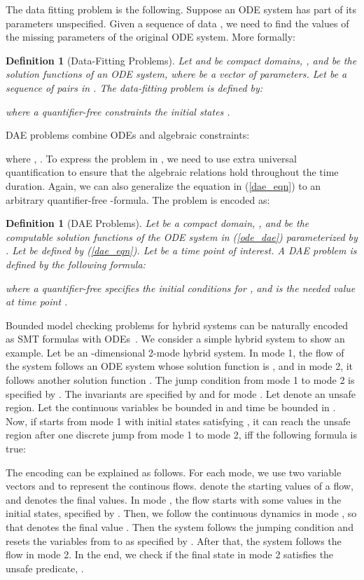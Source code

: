 \documentclass[12pt]{article}
\newtheorem{definition}[theorem]{Definition}
\begin{document}
The data fitting problem is the following. Suppose an ODE system has part of its parameters unspecified. Given a sequence of data , we need to find the values of the missing parameters of the original ODE system. More formally:
\begin{definition}[Data-Fitting Problems]
Let  and  be compact domains, , and  be the solution functions of an ODE system, where  be a vector of parameters. Let  be a sequence of pairs in . The data-fitting problem is defined by:

where a quantifier-free  constraints the initial states . 
\end{definition}


 DAE problems combine ODEs and algebraic constraints:

where , . To express the problem in , we need to use extra universal quantification to ensure that the algebraic relations hold throughout the time duration. Again, we can also generalize the equation in (\ref{dae_eqn}) to an arbitrary quantifier-free -formula. The problem is encoded as:
\begin{definition}[DAE Problems]
Let  be a compact domain, , and  be the computable solution functions of the ODE system in (\ref{ode_dae}) parameterized by . Let  be defined by (\ref{dae_eqn}). Let  be a time point of interest. A DAE problem is defined by the following formula:

where a quantifier-free  specifies the initial conditions for , and  is the needed value at time point . 
\end{definition}

 Bounded model checking problems for hybrid systems can be naturally encoded as SMT formulas with ODEs~\cite{Eggers2008,Eggers2011,DBLP:journals/sttt/IshiiUH11,DBLP:conf/fmcad/CimattiMT12,DBLP:conf/aaai/CimattiMT12}. We consider a simple hybrid system to show an example. Let  be an -dimensional 2-mode hybrid system. In mode 1, the flow of the system follows an ODE system whose solution function is , and in mode 2, it follows another solution function . The jump condition from mode 1 to mode 2 is specified by . The invariants are specified by  and for mode . Let  denote an unsafe region. Let the continuous variables be bounded in  and time be bounded in . Now, if  starts from mode 1 with initial states satisfying , it can reach the unsafe region after one discrete jump from mode 1 to mode 2, iff the following formula is true:
{\small

}The encoding can be explained as follows. For each mode, we use two variable vectors  and  to represent the continous flows.  denote the starting values of a flow, and  denotes the final values. In mode , the flow starts with some values in the initial states, specified by . Then, we follow the continuous dynamics in mode , so that  denotes the final value . Then the system follows the jumping condition and resets the variables from  to  as specified by . After that, the system follows the flow in mode 2. In the end, we check if the final state  in mode 2 satisfies the unsafe predicate, . 
\end{document}
